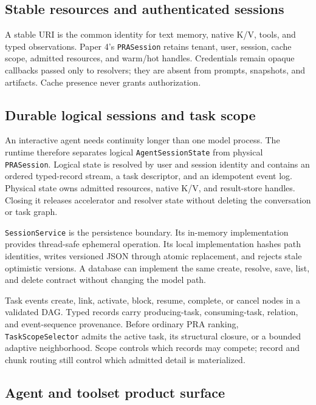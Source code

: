 \documentclass[11pt]{article}
\begin{document}
\subsection{Stable resources and authenticated sessions}

A stable URI is the common identity for text memory, native K/V, tools, and
typed observations.  Paper 4's \texttt{PRASession} retains tenant, user,
session, cache scope, admitted resources, and warm/hot handles.  Credentials
remain opaque callbacks passed only to resolvers; they are absent from prompts,
snapshots, and artifacts.  Cache presence never grants authorization.

\subsection{Durable logical sessions and task scope}

An interactive agent needs continuity longer than one model process. The
runtime therefore separates logical \texttt{AgentSessionState} from physical
\texttt{PRASession}. Logical state is resolved by user and session identity and
contains an ordered typed-record stream, a task descriptor, and an idempotent
event log. Physical state owns admitted resources, native K/V, and result-store
handles. Closing it releases accelerator and resolver state without deleting
the conversation or task graph.

\texttt{SessionService} is the persistence boundary. Its in-memory
implementation provides thread-safe ephemeral operation. Its local
implementation hashes path identities, writes versioned JSON through atomic
replacement, and rejects stale optimistic versions. A database can implement
the same create, resolve, save, list, and delete contract without changing the
model path.

Task events create, link, activate, block, resume, complete, or cancel nodes in
a validated DAG. Typed records carry producing-task, consuming-task, relation,
and event-sequence provenance. Before ordinary PRA ranking,
\texttt{TaskScopeSelector} admits the active task, its structural closure, or a
bounded adaptive neighborhood. Scope controls which records may compete;
record and chunk routing still control which admitted detail is materialized.

\subsection{Agent and toolset product surface}
\end{document}
